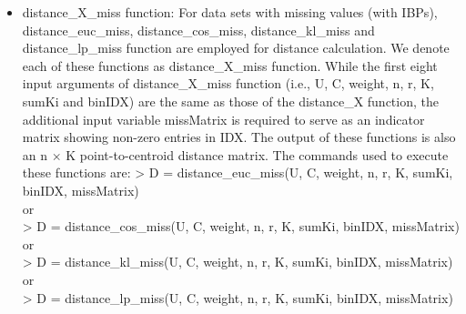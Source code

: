 \documentclass[acmsmall,screen,review]{acmart}
\begin{document}
\begin{itemize}
\item \textsf{distance\_X\_miss} function: For data sets with missing values (with IBPs), \textsf{distance\_euc\_miss}, \textsf{distance\_cos\_miss}, \textsf{distance\_kl\_miss} and \textsf{distance\_lp\_miss} function are employed for distance calculation. We denote each of these functions as \textsf{distance\_X\_miss} function. While the first eight input arguments of \textsf{distance\_X\_miss} function (i.e., \textsf{U}, \textsf{C}, \textsf{weight}, \textsf{n}, \textsf{r}, \textsf{K}, \textsf{sumKi} and \textsf{binIDX}) are the same as those of the \textsf{distance\_X} function, the additional input variable \textsf{missMatrix} is required to serve as an indicator matrix showing non-zero entries in \textsf{IDX}. The output of these functions is also an \textsf{n} $\times$ \textsf{K} point-to-centroid distance matrix. The commands used to execute these functions are:
\newline
\newline
\textsf{> D = distance\_euc\_miss(U, C, weight, n, r, K, sumKi, binIDX, missMatrix)} \\
or \\
\textsf{> D = distance\_cos\_miss(U, C, weight, n, r, K, sumKi, binIDX, missMatrix)} \\
or \\
\textsf{> D = distance\_kl\_miss(U, C, weight, n, r, K, sumKi, binIDX, missMatrix)} \\
or \\
\textsf{> D = distance\_lp\_miss(U, C, weight, n, r, K, sumKi, binIDX, missMatrix)}
\end{itemize}
\end{document}
